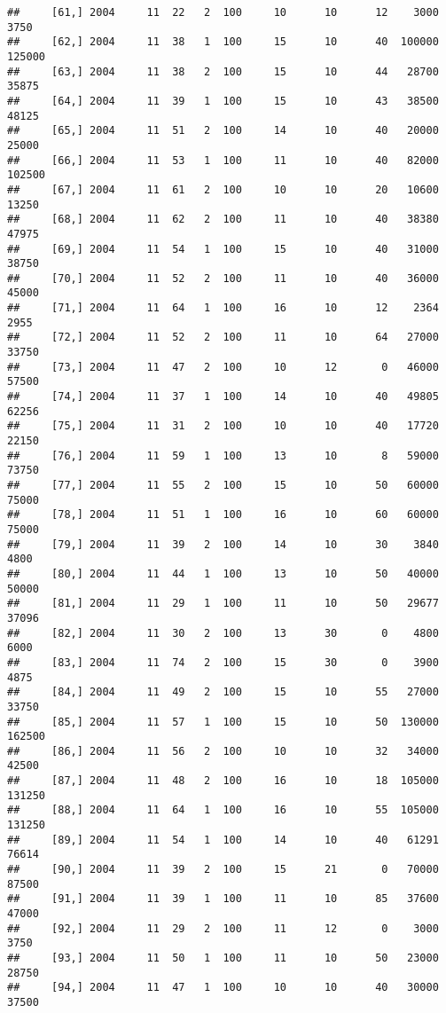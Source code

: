 \documentclass{article}\usepackage[]{graphicx}\usepackage[]{color}
\makeatletter
\newenvironment{kframe}{%
 \def\at@end@of@kframe{}%
 \ifinner\ifhmode%
  \def\at@end@of@kframe{\end{minipage}}%
  \begin{minipage}{\columnwidth}%
 \fi\fi%
 \def\FrameCommand##1{\hskip\@totalleftmargin \hskip-\fboxsep
 \colorbox{shadecolor}{##1}\hskip-\fboxsep
     \hskip-\linewidth \hskip-\@totalleftmargin \hskip\columnwidth}%
 \MakeFramed {\advance\hsize-\width
   \@totalleftmargin\z@ \linewidth\hsize
   \@setminipage}}%
 {\par\unskip\endMakeFramed%
 \at@end@of@kframe}
\newenvironment{knitrout}{}{} %
\makeatother
\begin{document}
\begin{knitrout}
\begin{kframe}
\begin{verbatim}
##     [61,] 2004     11  22   2  100     10      10      12    3000    3750
##     [62,] 2004     11  38   1  100     15      10      40  100000  125000
##     [63,] 2004     11  38   2  100     15      10      44   28700   35875
##     [64,] 2004     11  39   1  100     15      10      43   38500   48125
##     [65,] 2004     11  51   2  100     14      10      40   20000   25000
##     [66,] 2004     11  53   1  100     11      10      40   82000  102500
##     [67,] 2004     11  61   2  100     10      10      20   10600   13250
##     [68,] 2004     11  62   2  100     11      10      40   38380   47975
##     [69,] 2004     11  54   1  100     15      10      40   31000   38750
##     [70,] 2004     11  52   2  100     11      10      40   36000   45000
##     [71,] 2004     11  64   1  100     16      10      12    2364    2955
##     [72,] 2004     11  52   2  100     11      10      64   27000   33750
##     [73,] 2004     11  47   2  100     10      12       0   46000   57500
##     [74,] 2004     11  37   1  100     14      10      40   49805   62256
##     [75,] 2004     11  31   2  100     10      10      40   17720   22150
##     [76,] 2004     11  59   1  100     13      10       8   59000   73750
##     [77,] 2004     11  55   2  100     15      10      50   60000   75000
##     [78,] 2004     11  51   1  100     16      10      60   60000   75000
##     [79,] 2004     11  39   2  100     14      10      30    3840    4800
##     [80,] 2004     11  44   1  100     13      10      50   40000   50000
##     [81,] 2004     11  29   1  100     11      10      50   29677   37096
##     [82,] 2004     11  30   2  100     13      30       0    4800    6000
##     [83,] 2004     11  74   2  100     15      30       0    3900    4875
##     [84,] 2004     11  49   2  100     15      10      55   27000   33750
##     [85,] 2004     11  57   1  100     15      10      50  130000  162500
##     [86,] 2004     11  56   2  100     10      10      32   34000   42500
##     [87,] 2004     11  48   2  100     16      10      18  105000  131250
##     [88,] 2004     11  64   1  100     16      10      55  105000  131250
##     [89,] 2004     11  54   1  100     14      10      40   61291   76614
##     [90,] 2004     11  39   2  100     15      21       0   70000   87500
##     [91,] 2004     11  39   1  100     11      10      85   37600   47000
##     [92,] 2004     11  29   2  100     11      12       0    3000    3750
##     [93,] 2004     11  50   1  100     11      10      50   23000   28750
##     [94,] 2004     11  47   1  100     10      10      40   30000   37500

\end{verbatim}
\end{kframe}
\end{knitrout}
\end{document}
